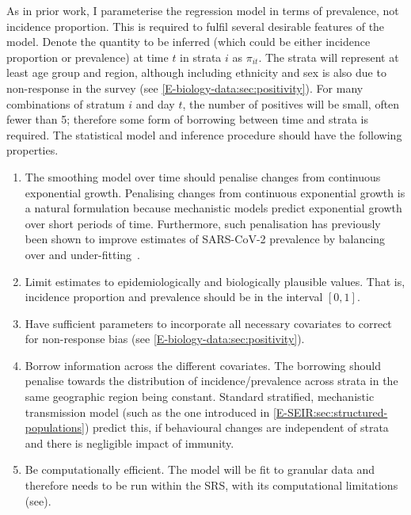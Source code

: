 \documentclass[thesis.tex]{subfiles}
\begin{document}
As in prior work, I parameterise the regression model in terms of prevalence, not incidence proportion.
This is required to fulfil several desirable features of the model.
Denote the quantity to be inferred (which could be either incidence proportion or prevalence) at time $t$ in strata $i$ as $\pi_{it}$.
The strata will represent at least age group and region, although including ethnicity and sex is also due to non-response in the survey (see \cref{E-biology-data:sec:positivity}).
For many combinations of stratum $i$ and day $t$, the number of positives will be small, often fewer than 5; therefore some form of borrowing between time and strata is required.
The statistical model and inference procedure should have the following properties.
\begin{enumerate}
    \item The smoothing model over time should penalise changes from continuous exponential growth.
        Penalising changes from continuous exponential growth is a natural formulation because mechanistic models predict exponential growth over short periods of time.
        Furthermore, such penalisation has previously been shown to improve estimates of SARS-CoV-2 prevalence by balancing over and under-fitting~\autocite{ealesAppropriately}.
    \item Limit estimates to epidemiologically and biologically plausible values.
        That is, incidence proportion and prevalence should be in the interval $[0, 1]$.
    \item Have sufficient parameters to incorporate all necessary covariates to correct for non-response bias (see \cref{E-biology-data:sec:positivity}).
    \item Borrow information across the different covariates.
        The borrowing should penalise towards the distribution of incidence/prevalence across strata in the same geographic region being constant.
        Standard stratified, mechanistic transmission model (such as the one introduced in \cref{E-SEIR:sec:structured-populations}) predict this, if behavioural changes are independent of strata and there is negligible impact of immunity.
    \item Be computationally efficient.
        The model will be fit to granular data and therefore needs to be run within the SRS, with its computational limitations (see).
\end{enumerate}
\end{document}
